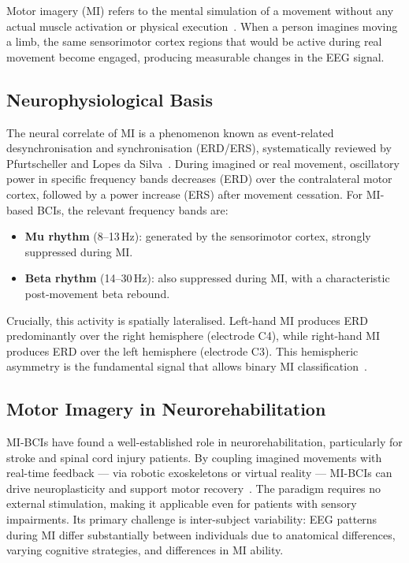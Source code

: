 \documentclass[english, bc, kiv, he, iso690alph, pdf]{fasthesis}
\begin{document}
Motor imagery (MI) refers to the mental simulation of a movement without any actual muscle activation or physical execution~\cite{yadav2025decoding}. When a person imagines moving a limb, the same sensorimotor cortex regions that would be active during real movement become engaged, producing measurable changes in the EEG signal.

\subsection{Neurophysiological Basis}

The neural correlate of MI is a phenomenon known as event-related desynchronisation and synchronisation (ERD/ERS), systematically reviewed by Pfurtscheller and Lopes da Silva~\cite{pfurtscheller1999event}. During imagined or real movement, oscillatory power in specific frequency bands decreases (ERD) over the contralateral motor cortex, followed by a power increase (ERS) after movement cessation. For MI-based BCIs, the relevant frequency bands are:

\begin{itemize}
    \item \textbf{Mu rhythm} (8--13\,Hz): generated by the sensorimotor cortex, strongly suppressed during MI.
    \item \textbf{Beta rhythm} (14--30\,Hz): also suppressed during MI, with a characteristic post-movement beta rebound.
\end{itemize}

Crucially, this activity is spatially lateralised. Left-hand MI produces ERD predominantly over the right hemisphere (electrode C4), while right-hand MI produces ERD over the left hemisphere (electrode C3). This hemispheric asymmetry is the fundamental signal that allows binary MI classification~\cite{pfurtscheller1999event}.

\subsection{Motor Imagery in Neurorehabilitation}

MI-BCIs have found a well-established role in neurorehabilitation, particularly for stroke and spinal cord injury patients. By coupling imagined movements with real-time feedback — via robotic exoskeletons or virtual reality — MI-BCIs can drive neuroplasticity and support motor recovery~\cite{yadav2025decoding}. The paradigm requires no external stimulation, making it applicable even for patients with sensory impairments. Its primary challenge is inter-subject variability: EEG patterns during MI differ substantially between individuals due to anatomical differences, varying cognitive strategies, and differences in MI ability.
\end{document}

